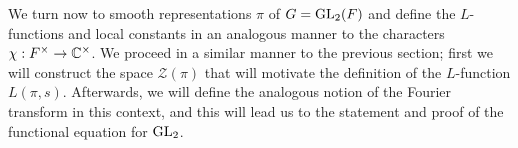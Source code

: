We turn now to smooth representations $\pi$ of $G=\mathrm{GL}_2(F)$ and define the $L$-functions and local constants in an analogous manner to the characters $\chi :F^\times \to \mathbb{C}^\times$. We proceed in a similar manner to the previous section; first we will construct the space $\mathcal{Z}(\pi)$ that will motivate the definition of the $L$-function $L(\pi,s)$. Afterwards, we will define the analogous notion of the Fourier transform in this context, and this will lead us to the statement and proof of the functional equation for $\mathrm{GL}_2$.







\newpage